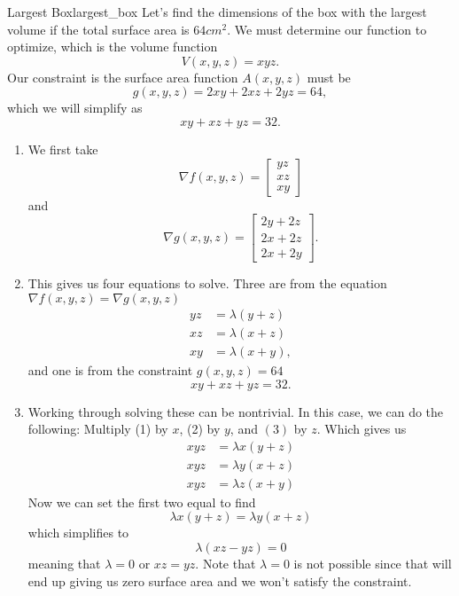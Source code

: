         \begin{ex}{Largest Box}{largest_box}
        Let's find the dimensions of the box with the largest volume if the total surface area is $64 cm^2$.  We must determine our function to optimize, which is the volume function
        \[
        V(x,y,z) = xyz.
        \]
        Our constraint is the surface area function $A(x,y,z)$ must be
        \[
        g(x,y,z)=2xy+2xz+2yz=64,
        \]
        which we will simplify as
        \[
        xy+xz+yz = 32.
        \]
        \begin{enumerate}
            \item We first take
            \[
            \nabla f(x,y,z) = \begin{bmatrix} yz \\ xz \\ xy \end{bmatrix}
            \]
            and
            \[
            \nabla g(x,y,z) = \begin{bmatrix} 2y+2z \\ 2x+2z \\ 2x+2y\end{bmatrix}.
            \]
            \item This gives us four equations to solve. Three are from the equation $\nabla f(x,y,z) =\nabla g(x,y,z)$
            \begin{align}
                yz &= \lambda (y+z)\\
                xz &= \lambda (x+z)\\
                xy &= \lambda (x+y),
            \end{align}
            and one is from the constraint $g(x,y,z)=64$
            \[
            xy+xz+yz = 32.
            \]
            \item Working through solving these can be nontrivial.  In this case, we can do the following: Multiply (1) by $x$, (2) by $y$, and $(3)$ by $z$.  Which gives us
            \begin{align*}
                xyz &= \lambda x(y+z)\\
                xyz &= \lambda y(x+z)\\
                xyz &= \lambda z(x+y)
            \end{align*}
            Now we can set the first two equal to find
            \[
            \lambda x(y+z)=\lambda y(x+z)
            \]
            which simplifies to 
            \[
            \lambda (xz-yz)=0
            \]
            meaning that $\lambda =0$ or $xz=yz$. Note that $\lambda =0$ is not possible since that will end up giving us zero surface area and we won't satisfy the constraint.
            

\end{enumerate}
\end{ex}
